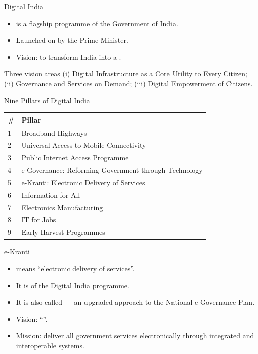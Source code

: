 \documentclass[aspectratio=169]{beamer}
\begin{document}
\begin{frame}{Digital India}
  \begin{itemize}
    \item {} is a flagship programme of the Government of
      India.
    \item Launched on  by the Prime Minister.
    \item Vision: to transform India into a .
  \end{itemize}
  \begin{block}{Three vision areas}
    (i) Digital Infrastructure as a Core Utility to Every Citizen;
    (ii) Governance and Services on Demand;
    (iii) Digital Empowerment of Citizens.
  \end{block}
\end{frame}

\begin{frame}{Nine Pillars of Digital India}
  \begin{center}
    \begin{tabular}{p{}p{}}
      \toprule
      \textbf{\#} & \textbf{Pillar} \\
      \midrule
      1 & Broadband Highways \\
      2 & Universal Access to Mobile Connectivity \\
      3 & Public Internet Access Programme \\
      4 & e-Governance: Reforming Government through Technology \\
      5 & e-Kranti: Electronic Delivery of Services \\
      6 & Information for All \\
      7 & Electronics Manufacturing \\
      8 & IT for Jobs \\
      9 & Early Harvest Programmes \\
      \bottomrule
    \end{tabular}
  \end{center}
  \vspace{0.2cm}
\end{frame}

\begin{frame}{e-Kranti}
  \begin{itemize}
    \item {} means ``electronic delivery of services''.
    \item It is  of the Digital India programme.
    \item It is also called  --- an upgraded approach to the
      National e-Governance Plan.
    \item Vision: ``''.
    \item Mission: deliver all government services electronically through
      integrated and interoperable systems.
  \end{itemize}
\end{frame}
\end{document}
